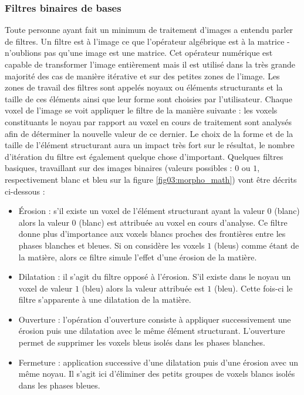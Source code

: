 		\subsubsection{Filtres binaires de bases}\label{para03:filtres}
			Toute personne ayant fait un minimum de traitement d'images a entendu parler de filtres. Un filtre est à l'image ce que l'opérateur algébrique est à la matrice - n'oublions pas qu'une image est une matrice. Cet opérateur numérique est capable de transformer l'image entièrement mais il est utilisé dans la très grande majorité des cas de manière itérative et sur des petites zones de l'image. Les zones de travail des filtres sont appelés noyaux ou éléments structurants et la taille de ces éléments ainsi que leur forme sont choisies par l'utilisateur. Chaque voxel de l'image se voit appliquer le filtre de la manière suivante : les voxels constituants le noyau par rapport au voxel en cours de traitement sont analysés afin de déterminer la nouvelle valeur de ce dernier. Le choix de la forme et de la taille de l'élément structurant aura un impact très fort sur le résultat, le nombre d'itération du filtre est également quelque chose d'important. Quelques filtres basiques, travaillant sur des images binaires (valeurs possibles : $0$ ou $1$, respectivement blanc et bleu sur la figure \ref{fig03:morpho_math}) vont être décrits ci-dessous :
			\begin{itemize}
				\item \'Erosion : s'il existe un voxel de l'élément structurant ayant la valeur $0$ (blanc) alors la valeur $0$ (blanc) est attribuée au voxel en cours d'analyse. Ce filtre donne plus d'importance aux voxels blancs proches des frontières entre les phases blanches et bleues. Si on considère les voxels $1$ (bleus) comme étant de la matière, alors ce filtre simule l'effet d'une érosion de la matière.
				\item Dilatation : il s'agit du filtre opposé à l'érosion. S'il existe dans le noyau un voxel de valeur $1$ (bleu) alors la valeur attribuée est $1$ (bleu). Cette fois-ci le filtre s'apparente à une dilatation de la matière.
				\item Ouverture : l'opération d'ouverture consiste à appliquer successivement une érosion puis une dilatation avec le même élément structurant. L'ouverture permet de supprimer les voxels bleus isolés dans les phases blanches.
				\item Fermeture : application successive d'une dilatation puis d'une érosion avec un même noyau. Il s'agit ici d'éliminer des petits groupes de voxels blancs isolés dans les phases bleues.
			\end{itemize}
